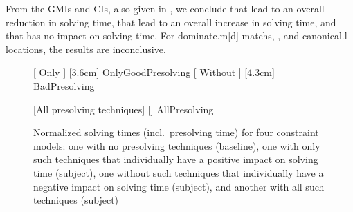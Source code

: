 %
From the \glspl{GMI} and \glspl{CI}, also given in
, we conclude
that  lead to an
overall reduction in solving time, that
 lead to an
overall increase in solving time, and that
 has no impact on solving time.
%
For \gls{dominate.m}[d] \glspl{match},
,
and \gls{canonical.l} \glspl{location}, the results are inconclusive.


\begin{figure}
  \centering%

                      [%
                        Only %
                      ]%
                      [3.6cm]%
                      {OnlyGoodPresolving}%
  \hfill%
                      [%
                        Without %
                      ]%
                      [4.3cm]%
                      {BadPresolving}%

  \vspace{\betweensubfigures}

                      [All presolving techniques]%
                      [\linewidth]%
                      {AllPresolving}%

  \caption[%
            Plot for evaluating the impact on solving time made by different
            combinations of presolving techniques%
          ]%
          {%
            Normalized solving times (incl.\ presolving time) for four
            constraint models: one with no presolving techniques (baseline), one
            with only such techniques that individually have a positive impact
            on solving time (subject), one without such techniques that
            individually have a negative impact on solving time (subject), and
            another with all such techniques (subject)%
          }
\end{figure}

